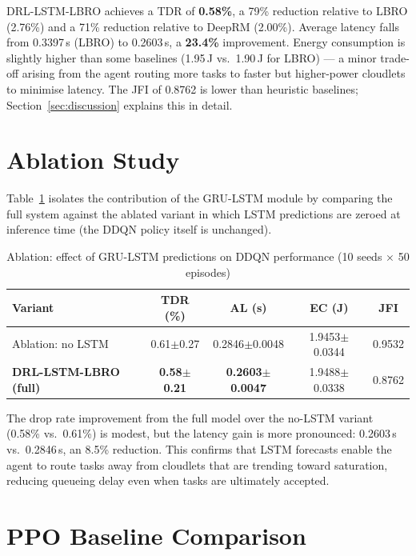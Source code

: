 DRL-LSTM-LBRO achieves a TDR of \textbf{0.58\%}, a 79\%
reduction relative to LBRO (2.76\%) and a 71\% reduction
relative to DeepRM (2.00\%). Average latency falls from
0.3397\,s (LBRO) to 0.2603\,s, a \textbf{23.4\%} improvement.
Energy consumption is slightly higher than some baselines
(1.95\,J vs.\ 1.90\,J for LBRO) — a minor trade-off arising
from the agent routing more tasks to faster but higher-power
cloudlets to minimise latency. The JFI of 0.8762 is lower than
heuristic baselines; Section~\ref{sec:discussion} explains this
in detail.

\section{Ablation Study}
\label{sec:ablation}

Table~\ref{tab:ablation} isolates the contribution of the
GRU-LSTM module by comparing the full system against the
ablated variant in which LSTM predictions are zeroed at
inference time (the DDQN policy itself is unchanged).

\begin{table}[htbp]
\centering
\caption{Ablation: effect of GRU-LSTM predictions on DDQN
         performance (10 seeds $\times$ 50 episodes)}
\label{tab:ablation}
\renewcommand{\arraystretch}{1.2}
\begin{tabular}{lcccc}
\toprule
\textbf{Variant} & \textbf{TDR (\%)} & \textbf{AL (s)}
  & \textbf{EC (J)} & \textbf{JFI} \\
\midrule
Ablation: no LSTM & 0.61$\pm$0.27 & 0.2846$\pm$0.0048
  & 1.9453$\pm$0.0344 & 0.9532 \\
\textbf{DRL-LSTM-LBRO (full)} & \textbf{0.58$\pm$0.21}
  & \textbf{0.2603$\pm$0.0047}
  & 1.9488$\pm$0.0338 & 0.8762 \\
\bottomrule
\end{tabular}
\end{table}

The drop rate improvement from the full model over the
no-LSTM variant (0.58\% vs.\ 0.61\%) is modest, but the
latency gain is more pronounced: 0.2603\,s vs.\ 0.2846\,s,
an 8.5\% reduction. This confirms that LSTM forecasts
enable the agent to route tasks away from cloudlets that
are trending toward saturation, reducing queueing delay
even when tasks are ultimately accepted.

\section{PPO Baseline Comparison}
\label{sec:ppo_results}


